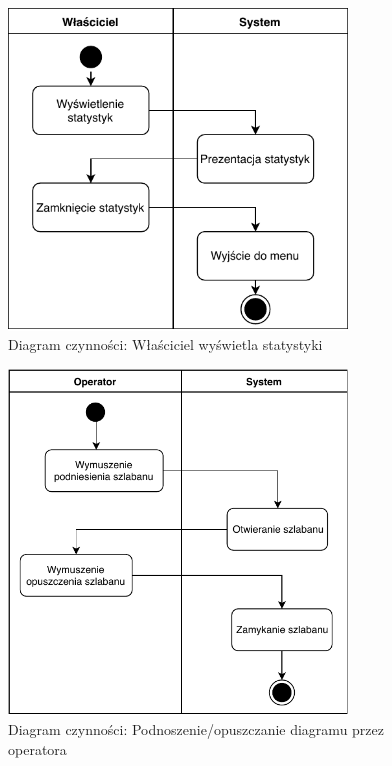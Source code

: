 \begin{figure}[H]
	\centering
	\includegraphics[width=90mm]{diagramy/DiagCzynStatystyki.pdf}
	\caption{Diagram czynności: Właściciel wyświetla statystyki}
\end{figure}


\begin{figure}[H]
	\centering
	\includegraphics[width=90mm]{diagramy/DiagCzynSzlaban.pdf}
	\caption{Diagram czynności: Podnoszenie/opuszczanie diagramu przez operatora}
\end{figure}



